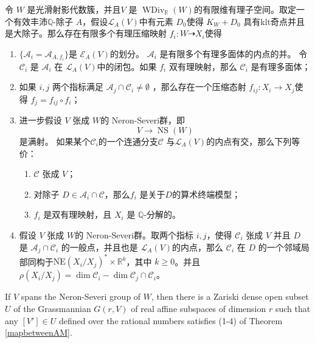 \begin{theorem}\label{mapbetweenAM}
  \cite[Theorem 3.3]{haconSarkisovProgram2012} 令 $W$ 是光滑射影代数簇，并且$ V $ 是 $ \operatorname{WDiv}_{\mathbb{R}}(W) $的有限维有理子空间。取定一个有效丰沛$\mathbb{Q}$-除子 $A$，假设$\mathcal{L}_{A}(V)$中有元素 $D_{0}$使得 $K_{W}+D_{0}$ 具有klt奇点并且是大除子。那么存在有限多个有理压缩映射 $ f_i:W\dashrightarrow X_i $使得 
  \begin{enumerate}
    \item $ \{\mathcal{A}_i=\mathcal{A}_{A,f_i}\} $是 $ \mathcal{E}_{A}(V) $的划分。 $ \mathcal{A}_{i} $ 是有限多个有理多面体的内点的并。 令$\mathcal{C}_{i}$ 是 $\mathcal{A}_{i}$ 在 $\mathcal{L}_{A}(V)$中的闭包。如果 $ f_i $ 双有理映射，那么 $ \mathcal{C}_i$ 是有理多面体；
    \item 如果 $ i,j $ 两个指标满足 $ \mathcal{A}_j\cap \mathcal{C}_i\neq \emptyset $ ，那么存在一个压缩态射 $ f_{ij}:X_i\to X_j $使得 $ f_j=f_{ij}\circ f_i $；
    \item 进一步假设 $ V $ 张成 $W$的 Neron-Severi群，即
          \[ V \to \operatorname{NS}(W) \]
          是满射。 如果某个$ \mathcal{C}_i $的一个连通分支$ \mathcal{C} $ 与$ \mathcal{L}_A(V) $的内点有交，那么下列等价：
          \begin{enumerate}
            \item $ \mathcal{C} $ 张成 $ V $；
            \item 对除子 $ D\in \mathcal{A}_i\cap \mathcal{C} $，那么$ f_i $ 是关于$ D $的算术终端模型；
            \item $ f_i $ 是双有理映射，且 $ X_i $ 是 $ \mathbb{Q} $-分解的。
          \end{enumerate}
    \item 假设 $ V $ 张成 $W$的 Neron-Severi群。取两个指标 $ i,j $，使得 $ \mathcal{C}_i $ 张成 $ V $ 并且 $ D $ 是 $ \mathcal{A}_j\cap \mathcal{C}_i $ 的一般点，并且也是 $ \mathcal{L}_A(V) $的内点，那么 $ \mathcal{C}_i $ 在 $D$ 的一个邻域局部同构于$ \overline{\mathrm{NE}}(X_i/X_j)^*\times \mathbb{R}^k $，其中 $ k\geqslant 0 $。并且 $ \rho(X_i/X_j)=\dim  \mathcal{C}_i-\dim \mathcal{C}_j\cap \mathcal{C}_i   $。
  \end{enumerate}
\end{theorem}

\begin{lemma}\label{subspace}
  \cite[Corollary 3.4]{haconSarkisovProgram2012} If $V$ spans the Neron-Severi group of $W$, then there is a Zariski dense open subset $U$ of the Grassmannian $G(r, V)$ of real affine subspaces of dimension $r$ such that any  $[V']\in U$ defined over the rational numbers satisfies (1-4) of Theorem \ref{mapbetweenAM}.
\end{lemma}

